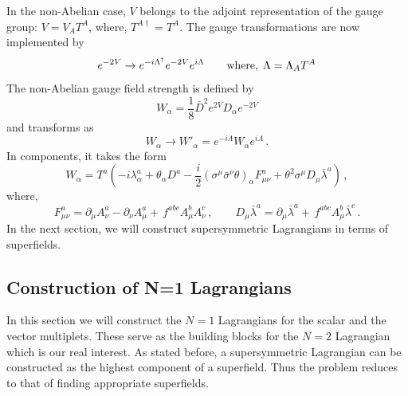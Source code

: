 In the non-Abelian case, $V$ belongs to the adjoint representation of
the gauge group: $V=V_AT^A$, where, $T^{A\dagger}=T^A$. The gauge
transformations are now implemented by 
$$
e^{-2V} \rightarrow e^{-i \Lambda^\dagger} e^{-2V} e^{i \Lambda}
\qquad {\rm where}, \; \Lambda = \Lambda_{A}T^{A}
$$
The non-Abelian gauge field strength is defined by 
$$
W_{\alpha} = \frac{1}{8} \bar{D}^{2} e^{2V} D_{\alpha} e^{-2V}
$$
and transforms as 
$$
W_\alpha\rightarrow W'_\alpha= e^{-i\Lambda}W_\alpha e^{i\Lambda}\,.
$$
In components, it takes the form
\begin{equation}
W_\alpha =T^a \left (-i \lambda^{a}_{\alpha} + \theta_{\alpha}
D^{a} - \frac{i}{2}(\sigma^\mu \bar{\sigma}^\nu \theta )_{\alpha}
F^{a}_{\mu\nu}+\theta^2 \sigma^\mu D_\mu\bar{\lambda}^a \right)\,, 
\label{W-nonabelian}
\end{equation}
where, 
$$
F^a_{\mu\nu}=\partial_\mu A^a_\nu -\partial_\nu A^a_\mu + 
\, f^{abc} A^b_\mu A^c_\nu\,,\qquad
D_\mu\bar{\lambda}^a=\partial_\mu\bar{\lambda}^a +
\,f^{abc} A_\mu^b \bar{\lambda}^c \,.
$$
In the next section, we will construct supersymmetric Lagrangians in
terms of superfields. 

\subsection{Construction of N=1 Lagrangians}

In this section we will construct the $N=1$ Lagrangians for the 
scalar and the vector multiplets. These serve as the building blocks
for the $N=2$ Lagrangian which is our real interest. As stated before,
a supersymmetric Lagrangian can be constructed as the highest
component of a superfield. Thus the problem reduces to that of finding
appropriate superfields. 

